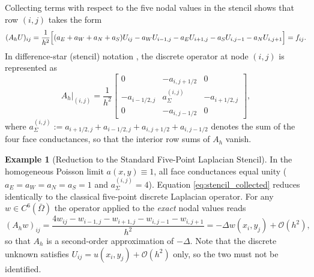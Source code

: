 \documentclass[11pt,a4paper]{article}
\theoremstyle{definition}
\newtheorem{example}[theorem]{Example}
\theoremstyle{remark}
\begin{document}
Collecting terms with respect to the five nodal values in the stencil shows that row $(i,j)$ takes the form
\begin{equation}
	(A_h U)_{ij} = \frac{1}{h^2}\Bigl[ (a_E + a_W + a_N + a_S)U_{ij} - a_W U_{i-1,j} - a_E U_{i+1,j} - a_S U_{i,j-1} - a_N U_{i,j+1} \Bigr] = f_{ij}.
	\label{eq:stencil_collected}
\end{equation}
In difference-star (stencil) notation \cite{hackbusch2017}, the discrete operator at node $(i,j)$ is represented as
\begin{equation}
	A_h\big|_{(i,j)} = \frac{1}{h^2}
	\begin{bmatrix}
		0 & -a_{i,j+1/2} & 0 \\[1mm]
		-a_{i-1/2,j} & a_\Sigma^{(i,j)} & -a_{i+1/2,j} \\[1mm]
		0 & -a_{i,j-1/2} & 0
	\end{bmatrix},
	\label{eq:stencil_star}
\end{equation}
where $a_\Sigma^{(i,j)} := a_{i+1/2,j} + a_{i-1/2,j} + a_{i,j+1/2} + a_{i,j-1/2}$ denotes the sum of the four face conductances, so that the interior row sums of $A_h$ vanish.

\begin{example}[Reduction to the Standard Five-Point Laplacian Stencil]
	In the homogeneous Poisson limit $a(x,y) \equiv 1$, all face conductances equal unity ($a_E = a_W = a_N = a_S = 1$ and $a_\Sigma^{(i,j)} = 4$). Equation \eqref{eq:stencil_collected} reduces identically to the classical five-point discrete Laplacian operator. For any $w \in C^6(\bar{\Omega})$ the operator applied to the \emph{exact} nodal values reads
	\begin{equation}
		(A_h w)_{ij} = \frac{4w_{ij} - w_{i-1,j} - w_{i+1,j} - w_{i,j-1} - w_{i,j+1}}{h^2} = -\Delta w(x_i,y_j) + \mathcal{O}(h^2),
		\label{eq:poisson_stencil}
	\end{equation}
so that $A_h$ is a second-order approximation of $-\Delta$. Note that the discrete unknown satisfies $U_{ij} = u(x_i,y_j) + \mathcal{O}(h^2)$ only, so the two must not be identified.
\end{example}
\end{document}

